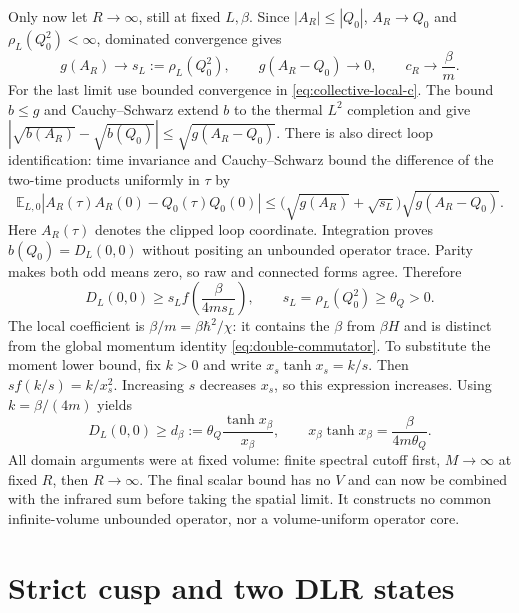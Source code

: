 \documentclass[11pt]{article}
\numberwithin{equation}{section}
\theoremstyle{definition}
\newcommand{\E}{\mathbb E}
\begin{document}
Only now let $R\to\infty$, still at fixed $L,\beta$.  Since
$|A_R|\leq|Q_0|$, $A_R\to Q_0$ and $\rho_L(Q_0^2)<\infty$,
dominated convergence gives
\begin{equation}
 g(A_R)\longrightarrow s_L:=\rho_L(Q_0^2),\qquad
 g(A_R-Q_0)\longrightarrow0,\qquad c_R\longrightarrow\frac\beta m.
 \label{eq:collective-coordinate-cutoff}
\end{equation}
For the last limit use bounded convergence in
\eqref{eq:collective-local-c}.  The bound $b\leq g$ and Cauchy--Schwarz
extend $b$ to the thermal $L^2$ completion and give
$|\sqrt{b(A_R)}-\sqrt{b(Q_0)}|\leq\sqrt{g(A_R-Q_0)}$.
There is also direct loop identification: time invariance and
Cauchy--Schwarz bound the difference of the two-time products uniformly in
$\tau$ by
\begin{equation}
 \E_{L,0}|A_R(\tau)A_R(0)-Q_0(\tau)Q_0(0)|
 \leq\big(\sqrt{g(A_R)}+\sqrt{s_L}\big)\sqrt{g(A_R-Q_0)}.
 \label{eq:collective-loop-clipping}
\end{equation}
Here $A_R(\tau)$ denotes the clipped loop coordinate.  Integration proves
$b(Q_0)=D_L(0,0)$ without positing an unbounded operator trace.  Parity
makes both odd means zero, so raw and connected forms agree.  Therefore
\begin{equation}
 D_L(0,0)\geq s_L f\left(\frac\beta{4ms_L}\right),\qquad
 s_L=\rho_L(Q_0^2)\geq\theta_Q>0. \label{eq:duhamel-lower-general}
\end{equation}
The local coefficient is $\beta/m=\beta\hbar^2/\chi$: it contains the
$\beta$ from $\beta H$ and is distinct from the global momentum identity
\eqref{eq:double-commutator}.  To substitute the moment lower bound, fix
$k>0$ and write $x_s\tanh x_s=k/s$.  Then
$s f(k/s)=k/x_s^2$.  Increasing $s$ decreases $x_s$, so this expression
increases.  Using $k=\beta/(4m)$ yields
\begin{equation}
 D_L(0,0)\geq d_\beta:=\theta_Q\frac{\tanh x_\beta}{x_\beta},\qquad
 x_\beta\tanh x_\beta=\frac\beta{4m\theta_Q}. \label{eq:d-beta}
\end{equation}
All domain arguments were at fixed volume: finite spectral cutoff first,
$M\to\infty$ at fixed $R$, then $R\to\infty$.  The final scalar bound
has no $V$ and can now be combined with the infrared sum before taking the
spatial limit.  It constructs no common infinite-volume unbounded operator,
nor a volume-uniform operator core.

\section{Strict cusp and two DLR states}
\label{sec:cusp}
\end{document}
